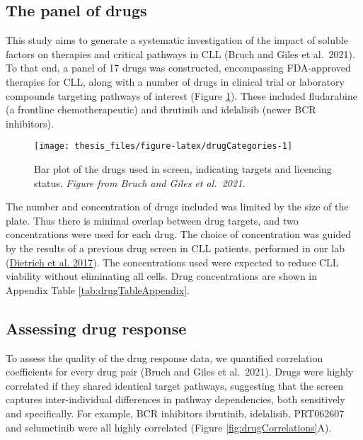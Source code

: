 \documentclass[11pt, a4paper, twosided]{book}
\begin{document}
\hypertarget{the-panel-of-drugs}{%
\subsection{The panel of drugs}\label{the-panel-of-drugs}}

This study aims to generate a systematic investigation of the impact of soluble factors on therapies and critical pathways in CLL (Bruch and Giles et al.~2021). To that end, a panel of 17 drugs was constructed, encompassing FDA-approved therapies for CLL, along with a number of drugs in clinical trial or laboratory compounds targeting pathways of interest (Figure \ref{fig:drugCategories}). These included fludarabine (a frontline chemotherapeutic) and ibrutinib and idelalisib (newer BCR inhibitors).


\begin{figure}

{\centering \texttt{[image: thesis\_files/figure-latex/drugCategories-1]} 

}

\caption{Bar plot of the drugs used in screen, indicating targets and licencing status. \emph{Figure from Bruch and Giles et al.~2021.}}\label{fig:drugCategories}
\end{figure}
The number and concentration of drugs included was limited by the size of the plate. Thus there is minimal overlap between drug targets, and two concentrations were used for each drug. The choice of concentration was guided by the results of a previous drug screen in CLL patients, performed in our lab (\protect\hyperlink{ref-JCIpaper}{Dietrich et al. 2017}). The concentrations used were expected to reduce CLL viability without eliminating all cells. Drug concentrations are shown in Appendix Table \ref{tab:drugTableAppendix}.

\hypertarget{drug-responses}{%
\subsection{Assessing drug response}\label{drug-responses}}

To assess the quality of the drug response data, we quantified correlation coefficients for every drug pair (Bruch and Giles et al.~2021). Drugs were highly correlated if they shared identical target pathways, suggesting that the screen captures inter-individual differences in pathway dependencies, both sensitively and specifically. For example, BCR inhibitors ibrutinib, idelalisib, PRT062607 and selumetinib were all highly correlated (Figure \ref{fig:drugCorrelations}A).
\end{document}
